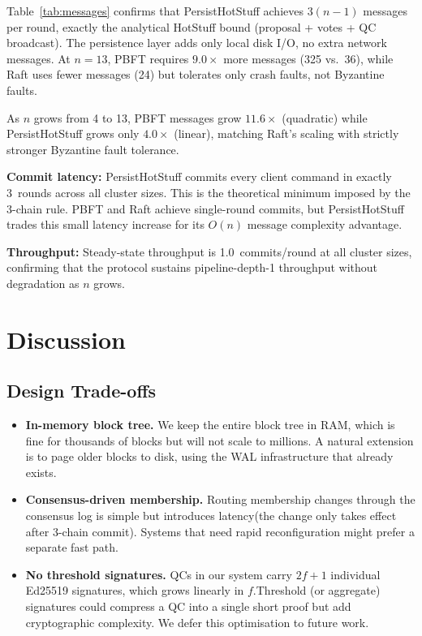 \documentclass{SVProc}
\begin{document}
\noindent Table~\ref{tab:messages} confirms that PersistHotStuff achieves
$3(n{-}1)$ messages per round, exactly the analytical HotStuff bound
(proposal + votes + QC broadcast). The persistence layer adds only
local disk I/O, no extra network messages.  At $n{=}13$, PBFT requires
$9.0\times$ more messages (325 vs.\ 36), while Raft uses fewer messages
(24) but tolerates only crash faults, not Byzantine faults.

\noindent As $n$ grows from 4 to 13, PBFT messages grow $11.6\times$
(quadratic) while PersistHotStuff grows only $4.0\times$ (linear),
matching Raft's scaling with strictly stronger Byzantine fault tolerance.

\smallskip\noindent\textbf{Commit latency:}\quad
PersistHotStuff commits every client command in exactly 3~rounds across
all cluster sizes.  This is the
theoretical minimum imposed by the 3-chain rule.  PBFT and Raft achieve
single-round commits, but PersistHotStuff trades this small latency
increase for its $O(n)$ message complexity advantage.

\smallskip\noindent\textbf{Throughput:}\quad
Steady-state throughput is 1.0~commits/round at all cluster sizes,
confirming that the protocol sustains pipeline-depth-1 throughput
without degradation as $n$ grows.

\section{Discussion}
\label{sec:discussion}

\subsection{Design Trade-offs}

\begin{itemize}
  \item \textbf{In-memory block tree.}  We keep the entire block tree in RAM, which is fine for thousands of blocks but will not scale to millions. A natural extension is to page older blocks to disk, using the WAL infrastructure that already exists.
  \item \textbf{Consensus-driven membership.}  Routing membership
    changes through the consensus log is simple but introduces latency(the change only takes effect after 3-chain commit).  Systems that need rapid reconfiguration might prefer a separate fast path.
  \item \textbf{No threshold signatures.}  QCs in our system carry $2f{+}1$ individual Ed25519 signatures, which grows linearly in $f$.Threshold (or aggregate) signatures could compress a QC into a single short proof but add cryptographic complexity. We defer this optimisation to future work.
\end{itemize}
\end{document}
